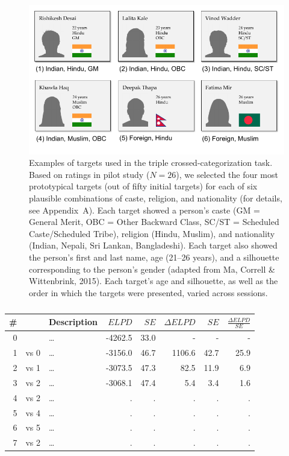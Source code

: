 \documentclass[12pt,a4paper]{article}
\begin{document}
\begin{figure}
\centering
\includegraphics[scale=1]{../figures/figure-1}
\caption{Examples of targets used in the triple crossed-categorization task. Based on ratings in pilot study ($N = 26$), we selected the four most prototypical targets (out of fifty initial targets) for each of six plausible combinations of caste, religion, and nationality (for details, see Appendix~A). Each target showed a person's caste (GM = General Merit, OBC = Other Backward Class, SC/ST = Scheduled Caste/Scheduled Tribe), religion (Hindu, Muslim), and nationality (Indian, Nepali, Sri Lankan, Bangladeshi). Each target also showed the person's first and last name, age (21--26 years), and a silhouette corresponding to the person's gender (adapted from Ma, Correll \& Wittenbrink, 2015). Each target's age and silhouette, as well as the order in which the targets were presented, varied across sessions.}
\label{fig:f1}
\end{figure}

\begin{table}
\caption{}
\centering
{}
\small	
\begin{tabularx}{\linewidth}{r@{~}rXrrrrr} \toprule
\# &  & Description & $\textit{ELPD}$ & $\textit{SE}$ & $\Delta\textit{ELPD}$ & $\textit{SE}$ & $\frac{\Delta\textit{ELPD}}{\textit{SE}}$ \\ \midrule 
0 &      & \ldots & -4262.5 & 33.0 & - & - & - \\
1 & vs 0 & \ldots & -3156.0 & 46.7 & 1106.6 & 42.7 & 25.9 \\
2 & vs 1 & \ldots & -3073.5 & 47.3 &   82.5 & 11.9 &  6.9 \\
3 & vs 2 & \ldots & -3068.1 & 47.4 &    5.4 &  3.4 &  1.6 \\ \midrule
4 & vs 2 & \ldots & . & . & . & . & . \\
5 & vs 4 & \ldots & . & . & . & . & . \\
6 & vs 5 & \ldots & . & . & . & . & . \\
7 & vs 2 & \ldots & . & . & . & . & . \\
\bottomrule
\end{tabularx}
\label{tab:t2}
\end{table}
\end{document}
